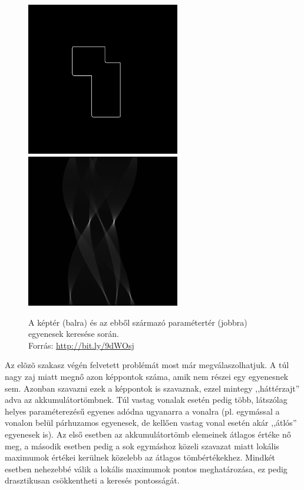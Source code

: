 \begin{figure}[!ht]
\centering
\includegraphics[width=67mm, keepaspectratio]{figures/houghparam_1.png}\hspace{1cm}
\includegraphics[width=67mm, keepaspectratio]{figures/houghparam_2.png}
\caption{A képtér (balra) és az ebből származó paramétertér (jobbra) egyenesek keresése során.\\Forrás: \url{http://bit.ly/9dWOsj}}
\label{fig:houghparam}
\end{figure}

Az elõzõ szakasz végén felvetett problémát most már megválaszolhatjuk. A túl nagy zaj miatt megnő azon képpontok száma, amik nem részei egy egyenesnek sem. Azonban szavazni ezek a képpontok is szavaznak, ezzel mintegy ,,háttérzajt'' adva az akkumulátortömbnek. Túl vastag vonalak esetén pedig több, látszólag helyes paraméterezésű egyenes adódna ugyanarra a vonalra (pl. egymással a vonalon belül párhuzamos egyenesek, de kellően vastag vonal esetén akár ,,átlós'' egyenesek is). Az első esetben az akkumulátortömb elemeinek átlagos értéke nő meg, a második esetben pedig a sok egymáshoz közeli szavazat miatt lokális maximumok értékei kerülnek közelebb az átlagos tömbértékekhez. Mindkét esetben nehezebbé válik a lokális maximumok pontos meghatározása, ez pedig drasztikusan csökkentheti a keresés pontosságát.

